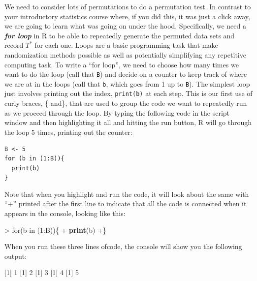 \documentclass[]{book}
\newenvironment{Shaded}{\begin{snugshade}}{\end{snugshade}}
\newcommand{\KeywordTok}[1]{\textcolor[rgb]{0.13,0.29,0.53}{\textbf{{#1}}}}
\newcommand{\DecValTok}[1]{\textcolor[rgb]{0.00,0.00,0.81}{{#1}}}
\newcommand{\StringTok}[1]{\textcolor[rgb]{0.31,0.60,0.02}{{#1}}}
\newcommand{\NormalTok}[1]{{#1}}
\begin{document}
We need to consider lots of permutations to do a permutation test. In
contrast to your introductory statistics course where, if you did this,
it was just a click away, we are going to learn what was going on under
the hood. Specifically, we need a \textbf{\emph{for loop}} in R to be
able to repeatedly generate the permuted data sets and record \(T^*\)
for each one. Loops are a basic programming task that make randomization
methods possible as well as potentially simplifying any repetitive
computing task. To write a ``for loop'', we need to choose how many
times we want to do the loop (call that \texttt{B}) and decide on a
counter to keep track of where we are at in the loops (call that
\texttt{b}, which goes from 1 up to \texttt{B}). The simplest loop just
involves printing out the index, \texttt{print(b)} at each step. This is
our first use of curly braces, \{ and\}, that are used to group the code
we want to repeatedly run as we proceed through the loop. By typing the
following code in the script window and then highlighting it all and
hitting the run button, R will go through the loop 5 times, printing out
the counter:

\begin{verbatim}
B <- 5
for (b in (1:B)){
  print(b)
}
\end{verbatim}

Note that when you highlight and run the code, it will look about the
same with ``+'' printed after the first line to indicate that all the
code is connected when it appears in the console, looking like this:

\begin{Shaded}
\begin{Highlighting}[]
\NormalTok{>}\StringTok{ }\NormalTok{for(b in (}\DecValTok{1}\NormalTok{:B))\{}
\NormalTok{+}\StringTok{   }\KeywordTok{print}\NormalTok{(b)}
\NormalTok{+\}}
\end{Highlighting}
\end{Shaded}

When you run these three lines ofcode, the console will show you the
following output:

\begin{Shaded}
\begin{Highlighting}[]
\NormalTok{[}\DecValTok{1}\NormalTok{] }\DecValTok{1}
\NormalTok{[}\DecValTok{1}\NormalTok{] }\DecValTok{2}
\NormalTok{[}\DecValTok{1}\NormalTok{] }\DecValTok{3}
\NormalTok{[}\DecValTok{1}\NormalTok{] }\DecValTok{4}
\NormalTok{[}\DecValTok{1}\NormalTok{] }\DecValTok{5}
\end{Highlighting}
\end{Shaded}
\end{document}
